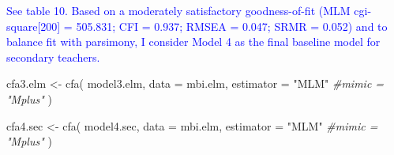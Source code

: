 \documentclass[
]{article}
\newenvironment{Shaded}{\begin{snugshade}}{\end{snugshade}}
\newcommand{\AttributeTok}[1]{\textcolor[rgb]{0.77,0.63,0.00}{#1}}
\newcommand{\CommentTok}[1]{\textcolor[rgb]{0.56,0.35,0.01}{\textit{#1}}}
\newcommand{\FunctionTok}[1]{\textcolor[rgb]{0.00,0.00,0.00}{#1}}
\newcommand{\NormalTok}[1]{#1}
\newcommand{\OtherTok}[1]{\textcolor[rgb]{0.56,0.35,0.01}{#1}}
\newcommand{\StringTok}[1]{\textcolor[rgb]{0.31,0.60,0.02}{#1}}
\begin{document}
\textcolor{blue}{See table 10. Based on a moderately satisfactory goodness-of-fit (MLM cgi-square[200] = 505.831; CFI = 0.937; RMSEA = 0.047; SRMR = 0.052) and to balance fit with parsimony, I consider Model 4 as the final baseline model for secondary teachers. }

\begin{Shaded}
\begin{Highlighting}[]
\NormalTok{cfa3.elm }\OtherTok{\textless{}{-}} 
  \FunctionTok{cfa}\NormalTok{(}
\NormalTok{    model3.elm, }
    \AttributeTok{data =}\NormalTok{ mbi.elm,  }
    \AttributeTok{estimator =} \StringTok{"MLM"}
    \CommentTok{\#mimic = "Mplus"}
\NormalTok{    )}

\NormalTok{cfa4.sec }\OtherTok{\textless{}{-}} 
  \FunctionTok{cfa}\NormalTok{(}
\NormalTok{    model4.sec, }
    \AttributeTok{data =}\NormalTok{ mbi.elm,  }
    \AttributeTok{estimator =} \StringTok{"MLM"}
    \CommentTok{\#mimic = "Mplus"}
\NormalTok{    )}
\end{Highlighting}
\end{Shaded}
\end{document}
